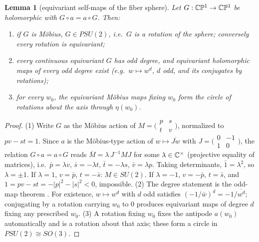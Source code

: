 \documentclass[11pt]{amsart}
\newtheorem{lemma}[theorem]{Lemma}
\theoremstyle{definition}
\theoremstyle{remark}
\begin{document}
\begin{lemma}[equivariant self-maps of the fiber
sphere]\label{lem:equivmaps}
Let $G:\mathbb{C}\mathbb{P}^1\to\mathbb{C}\mathbb{P}^1$ be holomorphic with $G\circ a=a\circ G$.
Then:
\begin{enumerate}
\item if $G$ is M\"obius, $G\in PSU(2)$, i.e.\ $G$ is a rotation of the
sphere; conversely every rotation is equivariant;
\item every continuous equivariant $G$ has odd degree, and equivariant
holomorphic maps of every odd degree exist \textup{(}e.g.\
$w\mapsto w^d$, $d$ odd, and its conjugates by rotations\textup{)};
\item for every $w_0$, the equivariant M\"obius maps fixing $w_0$ form
the circle of rotations about the axis through $\eta(w_0)$.
\end{enumerate}
\end{lemma}

\begin{proof}
(1) Write $G$ as the M\"obius action of
$M=\bigl(\begin{smallmatrix}p&s\\t&v\end{smallmatrix}\bigr)$, normalized
to $pv-st=1$.  Since $a$ is the M\"obius-type action of
$w\mapsto\overline{Jw}$ with
$J=\bigl(\begin{smallmatrix}0&-1\\1&0\end{smallmatrix}\bigr)$, the
relation $G\circ a=a\circ G$ reads $\overline{M}=\lambda\,J^{-1}MJ$ for
some $\lambda\in\mathbb{C}^\times$ (projective equality of matrices), i.e.\
$\bar p=\lambda v$, $\bar s=-\lambda t$, $\bar t=-\lambda s$,
$\bar v=\lambda p$.  Taking determinants, $\bar1=\lambda^2$, so
$\lambda=\pm1$.  If $\lambda=1$, $v=\bar p$, $t=-\bar s$: $M\in SU(2)$.
If $\lambda=-1$, $v=-\bar p$, $t=\bar s$, and
$1=pv-st=-|p|^2-|s|^2<0$, impossible.
(2) The degree statement is the odd-map theorem
\cite[Prop.~2B.6]{app-Hatcher}.  For existence, $w\mapsto w^d$ with $d$
odd satisfies $(-1/\bar w)^d=-1/\overline{w^d}$; conjugating by a
rotation carrying $w_0$ to $0$ produces equivariant maps of degree $d$
fixing any prescribed $w_0$.
(3) A rotation fixing $w_0$ fixes the antipode $a(w_0)$ automatically and
is a rotation about that axis; these form a circle in
$PSU(2)\cong SO(3)$.
\end{proof}
\end{document}
